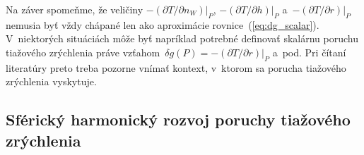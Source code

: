 \documentclass[a4paper, 12pt]{book}
\begin{document}
Na záver spomeňme, že veličiny $-\left(\partial T \slash \partial 
n_W\right)|_P$, $-\left(\partial T \slash \partial h\right)|_P$ 
a~$-\left(\partial T \slash \partial r\right)|_P$ nemusia byť vždy chápané len 
ako aproximácie rovnice~(\ref{eq:dg_scalar}).  V~niektorých situáciách môže byť 
napríklad potrebné definovať skalárnu poruchu tiažového zrýchlenia práve 
vzťahom~$\delta g(P) = -\left(\partial T \slash \partial r \right)|_P$ a~pod.  
Pri čítaní literatúry preto treba pozorne vnímať kontext, v~ktorom sa porucha 
tiažového zrýchlenia vyskytuje.


\subsection{Sférický harmonický rozvoj poruchy tiažového zrýchlenia}
\end{document}
